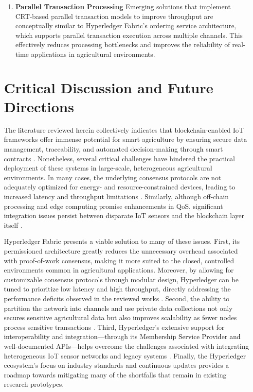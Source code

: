 \documentclass[12pt,onecolumn]{IEEEtran} %
\begin{document}
\begin{enumerate}
\item \textbf{Parallel Transaction Processing}  
   Emerging solutions that implement CRT-based parallel transaction models to improve throughput \cite{ali2022blockchainenabledarchitecture} are conceptually similar to Hyperledger Fabric's ordering service architecture, which supports parallel transaction execution across multiple channels. This effectively reduces processing bottlenecks and improves the reliability of real-time applications in agricultural environments.
\end{enumerate}



\section{Critical Discussion and Future Directions}\label{sec:crit-future}
The literature reviewed herein collectively indicates that blockchain-enabled IoT frameworks offer immense potential for smart agriculture by ensuring secure data management, traceability, and automated decision-making through smart contracts \cite{aliyu2023blockchainbasedsmartfarm, ellahi2023blockchainbasedframeworksfor}. Nonetheless, several critical challenges have hindered the practical deployment of these systems in large-scale, heterogeneous agricultural environments. In many cases, the underlying consensus protocols are not adequately optimized for energy- and resource-constrained devices, leading to increased latency and throughput limitations \cite{ali2022blockchainenabledarchitecture, morais2023surveyonintegration}. Similarly, although off-chain processing and edge computing promise enhancements in QoS, significant integration issues persist between disparate IoT sensors and the blockchain layer itself \cite{khan2022ablockchainand, sizan2505asecuredtriad}.

Hyperledger Fabric presents a viable solution to many of these issues. First, its permissioned architecture greatly reduces the unnecessary overhead associated with proof-of-work consensus, making it more suited to the closed, controlled environments common in agricultural applications. Moreover, by allowing for customizable consensus protocols through modular design, Hyperledger can be tuned to prioritize low latency and high throughput, directly addressing the performance deficits observed in the reviewed works \cite{ellahi2023blockchainbasedframeworksfor, sajja2023towardsapplicabilityof}. Second, the ability to partition the network into channels and use private data collections not only secures sensitive agricultural data but also improves scalability as fewer nodes process sensitive transactions \cite{sakthivel2024enhancingtransparencyand, morais2023surveyonintegration}. Third, Hyperledger's extensive support for interoperability and integration—through its Membership Service Provider and well-documented APIs—helps overcome the challenges associated with integrating heterogeneous IoT sensor networks and legacy systems \cite{aliyu2023blockchainbasedsmartfarm, tang2024assessingblockchainand}. Finally, the Hyperledger ecosystem's focus on industry standards and continuous updates provides a roadmap towards mitigating many of the shortfalls that remain in existing research prototypes.
\end{document}
